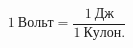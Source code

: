 \documentclass[a4paper]{article}
\begin{document}
	
	\[
	1 \ Вольт = \frac{1 \ Дж}{1 \ Кулон.}
	\]
	
\end{document}
